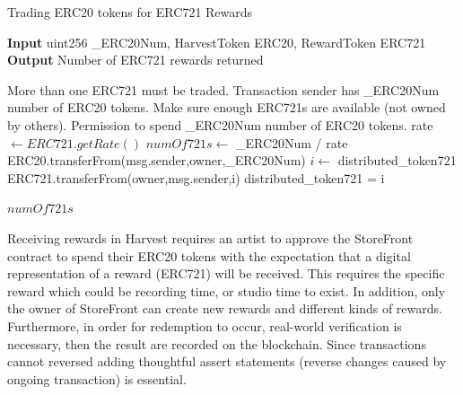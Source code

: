 \documentclass[12pt,tightenlines,letterpaper]{scrartcl}
\begin{document}
 
 \begin{algorithm}[ht]
   \caption{Trading ERC20 tokens for ERC721 Rewards}\label{alg:tradingTokens}
   \hspace*{\algorithmicindent} \textbf{Input} uint256 \_ERC20Num, HarvestToken ERC20, RewardToken ERC721 \\
   \hspace*{\algorithmicindent} \textbf{Output} Number of ERC721 rewards returned
   \begin{algorithmic}[1]
     \Require
       \Statex More than one ERC721 must be traded.
       \Statex Transaction sender has \_ERC20Num number of ERC20 tokens.
       \Statex Make sure enough ERC721s are available (not owned by others).
       \Statex Permission to spend \_ERC20Num number of ERC20 tokens.
     \Statex
     \State rate$ \gets ERC721.getRate()$ 
     \State  $ numOf721s \gets $ \_ERC20Num / rate
     \State ERC20.transferFrom(msg.sender,owner,\_ERC20Num) 
     \State $ i \gets $ distributed\_token721 	
     \Repeat
	     \State ERC721.transferFrom(owner,msg.sender,i)
     \State distributed\_token721 = i
     
     \Return $numOf721s$
   
   \end{algorithmic}
 \end{algorithm}
 
 Receiving rewards in Harvest requires an artist to approve the StoreFront contract to spend their ERC20 tokens with the expectation that a digital representation of a reward (ERC721) will be received. This requires the specific reward which could be recording time, or studio time to exist. In addition, only the owner of StoreFront can create new rewards and different kinds of rewards. Furthermore, in order for redemption to occur, real-world verification is necessary, then the result are recorded on the \gls{blockchain}. Since transactions cannot reversed adding thoughtful assert statements (reverse changes caused by ongoing transaction) is essential.
   
\end{document}
